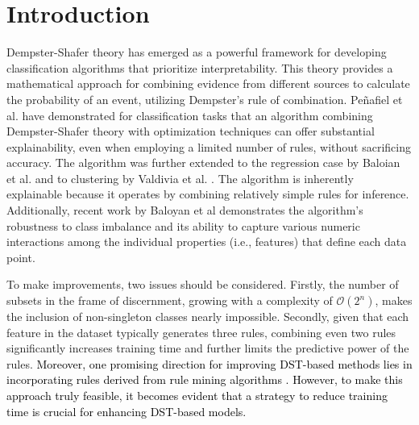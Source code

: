 \documentclass[10pt,a4paper,oneside]{article}
\begin{document}
{\selectfont
\begin{keywords}
{\fontsize{9pt}{9pt}\selectfont{
Dempster-Shafer Theory, Interpretability, KMeans, Mass Assignment Functions, Classification}}
\end{keywords}
}

{\selectfont
\begin{category}
{\fontsize{9pt}{9pt}\selectfont{
I.2.6, I.5, G.3
}}
\end{category}}




\section{Introduction}\label{sec1}
Dempster-Shafer theory \cite{dst} has emerged as a powerful framework for developing classification algorithms that prioritize interpretability. This theory provides a mathematical approach for combining evidence from different sources to calculate the probability of an event, utilizing Dempster's rule of combination. Peñafiel et al. \cite{sergio} have demonstrated {\color{black} for classification tasks} that an algorithm combining Dempster-Shafer theory with optimization techniques can offer substantial explainability, even when employing a limited number of rules, without sacrificing accuracy. {\color{black} The algorithm was further extended to the regression case by Baloian et al. \cite{Nelson} and to clustering by Valdivia et al. \cite{dsClustering}}. The algorithm is inherently explainable because it operates by combining relatively simple rules for inference. {\color{black}Additionally, recent work by Baloyan et al \cite{Aneta} demonstrates {\color{black}the} algorithm's robustness to class imbalance and its ability to capture various numeric interactions {\color{black} among the individual properties (i.e., features) that define each data point.}}

To make improvements, two issues should be considered.  Firstly, the number of subsets in the frame of discernment, growing with a complexity of $\mathcal{O}(2^n)$, makes the inclusion of non-singleton classes nearly impossible. Secondly, given that each feature in the dataset typically generates three rules, combining even two rules significantly increases training time and further limits the predictive power of the rules. 
\textcolor{black}
{
Moreover, one promising direction for improving DST-based methods lies in incorporating rules derived from rule mining algorithms \cite{ripper, c5, skoperules}. However, to make this approach truly feasible, it becomes evident that a strategy to reduce training time is crucial for enhancing DST-based models.
}
\end{document}
